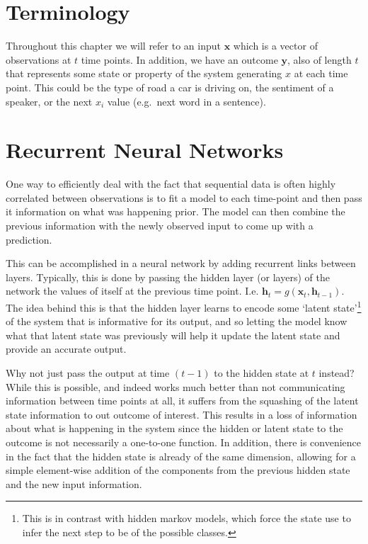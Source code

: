 \documentclass[]{book}
\let\rmarkdownfootnote\footnote%
\def\footnote{\protect\rmarkdownfootnote}
\theoremstyle{definition}
\theoremstyle{definition}
\theoremstyle{definition}
\theoremstyle{remark}
\begin{document}
\section{Terminology}\label{terminology-1}

Throughout this chapter we will refer to an input \(\mathbf{x}\) which
is a vector of observations at \(t\) time points. In addition, we have
an outcome \(\mathbf{y}\), also of length \(t\) that represents some
state or property of the system generating \(x\) at each time point.
This could be the type of road a car is driving on, the sentiment of a
speaker, or the next \(x_i\) value (e.g.~next word in a sentence).

\section{Recurrent Neural Networks}\label{recurrent-neural-networks}

One way to efficiently deal with the fact that sequential data is often
highly correlated between observations is to fit a model to each
time-point and then pass it information on what was happening prior. The
model can then combine the previous information with the newly observed
input to come up with a prediction.

This can be accomplished in a neural network by adding recurrent links
between layers. Typically, this is done by passing the hidden layer (or
layers) of the network the values of itself at the previous time point.
I.e. \(\mathbf{h}_{t} = g(\mathbf{x}_t, \mathbf{h}_{t - 1})\). The idea
behind this is that the hidden layer learns to encode some `latent
state'\footnote{This is in contrast with hidden markov models, which
  force the state use to infer the next step to be of the possible
  classes.} of the system that is informative for its output, and so
letting the model know what that latent state was previously will help
it update the latent state and provide an accurate output.

Why not just pass the output at time \((t-1)\) to the hidden state at
\(t\) instead? While this is possible, and indeed works much better than
not communicating information between time points at all, it suffers
from the squashing of the latent state information to out outcome of
interest. This results in a loss of information about what is happening
in the system since the hidden or latent state to the outcome is not
necessarily a one-to-one function. In addition, there is convenience in
the fact that the hidden state is already of the same dimension,
allowing for a simple element-wise addition of the components from the
previous hidden state and the new input information.
\end{document}
